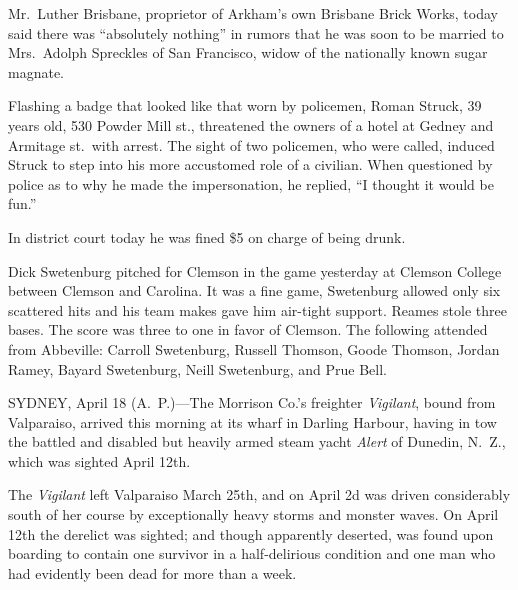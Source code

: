 \documentclass{newspaper1920}
\def\minipageheight{37}
\begin{document}
\begin{multicols}{3}
Mr.~Luther Brisbane, proprietor of Arkham's own Brisbane Brick Works,
today said there was ``absolutely nothing'' in rumors that he was soon
to be married to Mrs.~Adolph Spreckles of San Francisco, widow of the
nationally known sugar magnate.

\halfrule


Flashing a badge that looked like that worn by policemen, Roman
Struck, 39 years old, 530 Powder Mill st., threatened the owners of a
hotel at Gedney and Armitage st.\ with arrest.  The sight of two
policemen, who were called, induced Struck to step into his more
accustomed role of a civilian.  When questioned by police as to why he
made the impersonation, he replied, ``I thought it would be fun.''

In district court today he was fined \$5 on charge of being drunk.

\halfrule


Dick Swetenburg pitched for Clemson in the game yesterday at Clemson
College between Clemson and Carolina.  It was a fine game, Swetenburg
allowed only six scattered hits and his team makes gave him air-tight
support.  Reames stole three bases.  The score was three to one in
favor of Clemson.  The following attended from Abbeville: Carroll
Swetenburg, Russell Thomson, Goode Thomson, Jordan Ramey, Bayard
Swetenburg, Neill Swetenburg, and Prue Bell.

\columnbreak

\noindent
\begin{minipage}[t][\minipageheight\baselineskip]{2\columnwidth+1\columnsep}
\fancyrule
\vspace{-\baselineskip}
\vspace{-0.5\baselineskip}
\begin{multicols}{2}
SYDNEY, April 18 (A.~P.)---The Morrison Co.'s freighter
\emph{Vigilant}, bound from Valparaiso, arrived this morning at its
wharf in Darling Harbour, having in tow the battled and disabled but
heavily armed steam yacht \emph{Alert} of Dunedin, N.~Z., which was
sighted April 12th.

The \emph{Vigilant} left Valparaiso March 25th, and on April 2d was
driven considerably south of her course by exceptionally heavy storms
and monster waves.  On April 12th the derelict was sighted; and though
apparently deserted, was found upon boarding to contain one survivor
in a half-delirious condition and one man who had evidently been dead
for more than a week.


\end{multicols}
\end{minipage}
\end{multicols}
\end{document}
